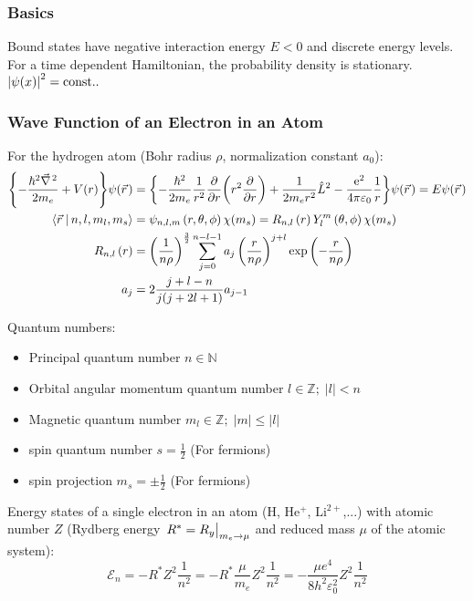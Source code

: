 		\subsubsection{Basics}
			\noindent
			Bound states have negative interaction energy $E<0$ and discrete energy levels. For a time dependent Hamiltonian, the probability density is stationary.
			$\left|\psi(x)\right|^2=\mathrm{const.}.$

		\subsubsection{Wave Function of an Electron in an Atom}
			\noindent
			For the hydrogen atom (Bohr radius $\rho$, normalization constant $a_0$):
			\begin{equation}
				\begin{aligned}
					\qty{-\frac{\hbar^2 \Nabla^2}{2 m_e} + V(r)}\psi(\vec{r})
					&= \qty{-\frac{\hbar^2}{2 m_e}\frac{1}{r^2}\pdv{r}\qty(r^2\pdv{r}) + \frac{1}{2 m_e r^2} \hat{L}^2 - \frac{\ex^2}{4\pi\varepsilon_0}\frac{1}{r}}\psi(\vec{r})
					= E \psi\qty(\vec{r})
					\\
					\Braket{\vec{r}|n,l,m_l,m_s} &= \psi_{n,l,m}\left(r,\theta,\phi\right)\chi(m_s)
					= R_{n,l}\left(r\right) Y_l^m\left(\theta,\phi\right)\chi(m_s) \\
					R_{n,l}\left(r\right)
					&= \left(\frac{1}{n\rho}\right)^{\frac{3}{2}}
					\sum_{j=0}^{n-l-1} a_j \left(\frac{r}{n\rho}\right)^{j+l} \exp\left({-\frac{r}{n\rho}}\right) \\
					a_j &= 2\frac{j+l-n}{j(j+2l+1)} a_{j-1} \\
				\end{aligned}
			\end{equation}

			\noindent
			Quantum numbers:
			\begin{itemize}
				\item Principal quantum number $n \in \mathbb{N}$
				\item Orbital angular momentum quantum number $l \in \mathbb{Z};\; \left|l\right| < n$
				\item Magnetic quantum number $m_l \in \mathbb{Z};\; \left|m\right| \le \left|l\right|$
				\item spin quantum number $s = \frac{1}{2}$ (For fermions)
				\item spin projection $m_s = \pm \frac{1}{2}$ (For fermions)
			\end{itemize}

			\noindent
			Energy states of a single electron in an atom ($\mathrm{H}$, $\mathrm{He^{+}}$, $\mathrm{Li^{2+}}$,...) with atomic number $Z$ (Rydberg energy $\eval{R^*=R_y}_{m_e \to \mu}$ and reduced mass $\mu$ of the atomic system):
			\begin{equation}
				\mathcal{E}_n = -R^* Z^2 \frac{1}{n^2} = -R^* \frac{\mu}{m_e} Z^2 \frac{1}{n^2} = - \frac{\mu e^4}{8 h^2 \varepsilon_0^2} Z^2 \frac{1}{n^2}
			\end{equation}

